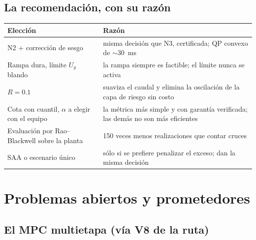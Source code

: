 \subsection{La recomendación, con su razón}
\begin{center}\small
\begin{tabularx}{\linewidth}{@{}>{\raggedright\arraybackslash}p{40mm} Y@{}}\toprule
Elección & Razón\\\midrule
N2 + corrección de sesgo & misma decisión que N3, certificada; QP convexo de $\sim30$~ms\\
Rampa dura, límite $U_y$ blando & la rampa siempre es factible; el límite nunca se activa\\
$R=0.1$ & suaviza el caudal y elimina la oscilación de la capa de riesgo sin costo\\
Cota con cuantil, $\alpha$ a elegir con el equipo & la métrica más simple y con garantía verificada; las demás no son más eficientes\\
Evaluación por Rao--Blackwell sobre la planta & 150 veces menos realizaciones que contar cruces\\
SAA o escenario único & sólo si se prefiere penalizar el exceso; dan la misma decisión\\\bottomrule
\end{tabularx}
\end{center}


\section{Problemas abiertos y prometedores}\label{sec:riesgo-futuro}
\subsection{El MPC multietapa (vía V8 de la ruta)}
